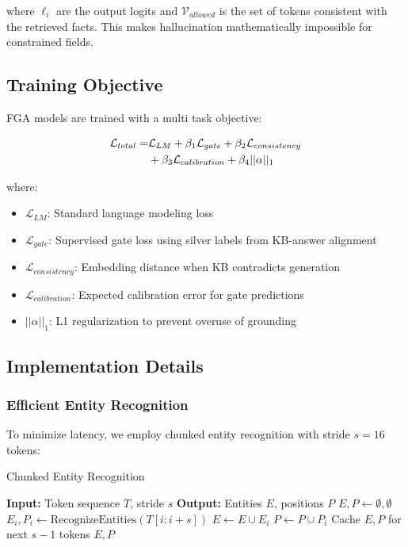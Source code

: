 \documentclass[11pt, a4paper]{article}
\theoremstyle{definition}
\begin{document}
where $\ell_i$ are the output logits and $\mathcal{V}_{allowed}$ is the set of tokens consistent with the retrieved facts. This makes hallucination mathematically impossible for constrained fields.

\subsection{Training Objective}

FGA models are trained with a multi task objective:

\begin{align}
\mathcal{L}_{total} = &\mathcal{L}_{LM} + \beta_1 \mathcal{L}_{gate} + \beta_2 \mathcal{L}_{consistency} \notag \\
&+ \beta_3 \mathcal{L}_{calibration} + \beta_4 ||\alpha||_1
\end{align}

where:
\begin{itemize}
    \item $\mathcal{L}_{LM}$: Standard language modeling loss
    \item $\mathcal{L}_{gate}$: Supervised gate loss using silver labels from KB-answer alignment
    \item $\mathcal{L}_{consistency}$: Embedding distance when KB contradicts generation
    \item $\mathcal{L}_{calibration}$: Expected calibration error for gate predictions
    \item $||\alpha||_1$: L1 regularization to prevent overuse of grounding
\end{itemize}

\subsection{Implementation Details}

\subsubsection{Efficient Entity Recognition}

To minimize latency, we employ chunked entity recognition with stride $s=16$ tokens:

\begin{algorithm}
\caption{Chunked Entity Recognition}
\begin{algorithmic}
\STATE \textbf{Input:} Token sequence $T$, stride $s$
\STATE \textbf{Output:} Entities $E$, positions $P$
\STATE $E, P \leftarrow \emptyset, \emptyset$
    \STATE $E_i, P_i \leftarrow \text{RecognizeEntities}(T[i:i+s])$
    \STATE $E \leftarrow E \cup E_i$
    \STATE $P \leftarrow P \cup P_i$
\ENDFOR
\STATE Cache $E, P$ for next $s-1$ tokens
\RETURN $E, P$
\end{algorithmic}
\end{algorithm}
\end{document}
